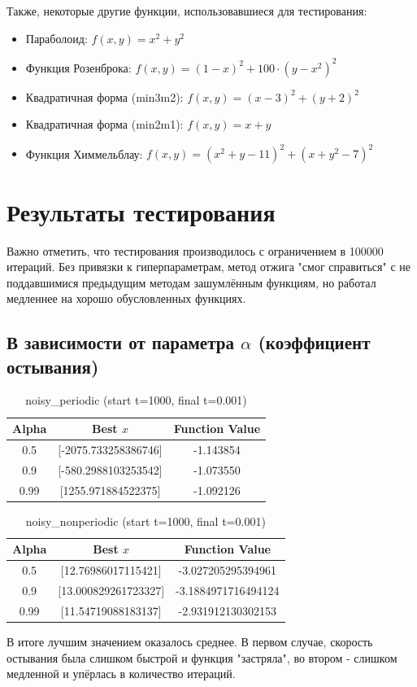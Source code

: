 \documentclass{article}
\begin{document}
Также, некоторые другие функции, использовавшиеся для тестирования:

\begin{itemize}
    \item Параболоид: $f(x, y) = x^2 + y^2$
    \item Функция Розенброка: $f(x, y) = (1 - x)^2 + 100 \cdot (y - x^2)^2$
    \item Квадратичная форма (min3m2): $f(x, y) = (x - 3)^2 + (y + 2)^2$
    \item Квадратичная форма (min2m1): $f(x, y) = x + y$
    \item Функция Химмельблау: $f(x, y) = (x^2 + y - 11)^2 + (x + y^2 - 7)^2$
\end{itemize}


\section{Результаты тестирования}
Важно отметить, что тестирования производилось с ограничением в 100000 итераций. Без привязки к гиперпараметрам, метод отжига "смог справиться" с не поддавшимися предыдущим методам зашумлённым функциям, но работал медленнее на хорошо обусловленных функциях.

\subsection{В зависимости от параметра $\alpha$ (коэффициент остывания)}
\begin{table}[H]
\centering
\begin{tabular}{|c|c|c|}
\hline
\textbf{Alpha} & \textbf{Best $x$} & \textbf{Function Value} \\
\hline
0.5 & [-2075.733258386746] & -1.143854 \\
0.9 & [-580.2988103253542] & -1.073550 \\
0.99 & [1255.971884522375] & -1.092126 \\
\hline
\end{tabular}
\caption{noisy\_periodic (start t=1000, final t=0.001)}
\end{table}
\begin{table}[H]
\centering
\begin{tabular}{|c|c|c|}
\hline
\textbf{Alpha} & \textbf{Best $x$} & \textbf{Function Value} \\
\hline
0.5 & [12.76986017115421] & -3.027205295394961 \\
0.9 & [13.000829261723327] & -3.1884971716494124 \\
0.99 & [11.54719088183137] & -2.931912130302153 \\
\hline
\end{tabular}
\caption{noisy\_nonperiodic (start t=1000, final t=0.001)}
\end{table}
В итоге лучшим значением оказалось среднее. В первом случае, скорость остывания была слишком быстрой и функция "застряла", во втором - слишком медленной и упёрлась в количество итераций.
\end{document}
